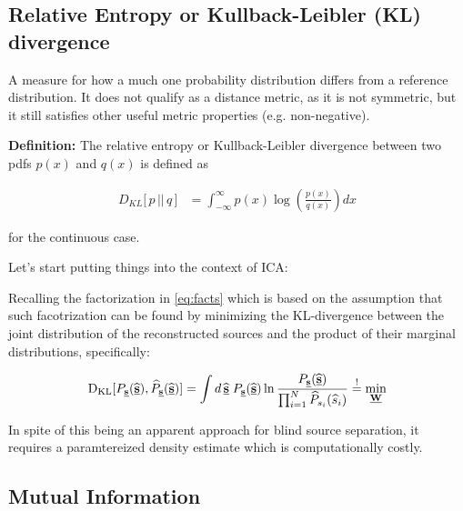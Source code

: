 \subsection{Relative Entropy or Kullback-Leibler (KL) divergence}

A measure for how a much one probability distribution differs from a reference distribution. 
It does not qualify as a distance metric, as it is not symmetric, but it still satisfies other useful metric properties (e.g. non-negative).

\textbf{Definition:} 
The relative entropy or Kullback-Leibler divergence between two pdfs $p(x)$ and $q(x)$ is defined as



\begin{align}
\label{eq:klcont}
D_{KL}\lbrack\,p\, ||\, q\,\rbrack 
&= \int_{-\infty}^{\infty} p(x) \log \left( \frac{p(x)}{q(x)} \right) dx
\end{align}

for the continuous case.

\newpage 
Let's start putting things into the context of ICA:

Recalling the factorization in \eqref{eq:facts} which is based on the assumption that such facotrization can be found by minimizing 
the KL-divergence between the joint distribution of the reconstructed sources and the product of their marginal distributions, specifically:

\begin{equation}
\label{eq:klmin}
	\mathrm{D}_{\mathrm{KL}}[P_{\underline{\mathbf{s}}}(\widehat{\underline{\mathbf{s}}}),\widehat{P}_{\underline{\mathbf{s}}}(\widehat{\underline{\mathbf{s}}})] = 
    \int d \, \widehat{\underline{\mathbf{s}}} \; P_{\underline{\mathbf{s}}}(\widehat{\underline{\mathbf{s}}})
		\ln \frac{P_{\underline{\mathbf{s}}}(\widehat{\underline{\mathbf{s}}})}{
			\prod_{i = 1}^N \widehat{P}_{s_i}(\widehat{s}_i) }
		\stackrel{\mathrm{!}}{=} \min_{\underline{\mathbf{W}}}
\end{equation}

In spite of this being an apparent approach for blind source separation, it requires a paramtereized density estimate which is computationally costly.

\subsection{Mutual Information}

